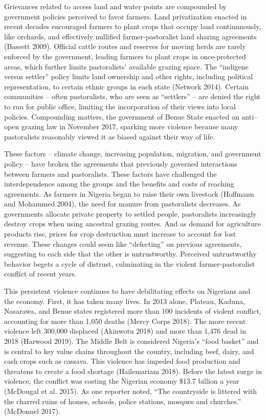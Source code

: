 \documentclass[11pt]{article}
\begin{document}
Grievances related to access land and water points are compounded by
government policies perceived to favor farmers. Land privatization
enacted in recent decades encouraged farmers to plant crops that occupy
land continunously, like orchards, and effectively nullified
farmer-pastoralist land sharing agreements (Bassett 2009). Official
cattle routes and reserves for moving herds are rarely enforced by the
government, leading farmers to plant crops in once-protected areas,
which further limits pastoralists' available grazing space. The
``indigene versus settler'' policy limits land ownership and other
rights, including political representation, to certain ethnic groups in
each state (Network 2014). Certain communities -- often pastoralists,
who are seen as ``settlers'' -- are denied the right to run for public
office, limiting the incorporation of their views into local policies.
Compounding matters, the government of Benue State enacted an anti--open
grazing law in November 2017, sparking more violence because many
pastoralists reasonably viewed it as biased against their way of life.

These factors -- climate change, increasing population, migration, and
government policy -- have broken the agreements that previously governed
interactions between farmers and pastoralists. These factors have
challenged the interdependence among the groups and the benefits and
costs of reaching agreements. As farmers in Nigeria began to raise their
own livestock (Hoffmann and Mohammed 2004), the need for manure from
pastoralists decreases. As governments allocate private property to
settled people, pastoralists increasingly destroy crops when using
ancestral grazing routes. And as demand for agriculture products rise,
prices for crop destruction must increase to account for lost revenue.
These changes could seem like ``defecting'' on previous agreements,
suggesting to each side that the other is untrustworthy. Perceived
untrustworthy behavior begets a cycle of distrust, culminating in the
violent farmer-pastoralist conflict of recent years.

This persistent violence continues to have debilitating effects on
Nigerians and the economy. First, it has taken many lives. In 2013
alone, Plateau, Kaduna, Nasarawa, and Benue states registered more than
100 incidents of violent conflict, accounting for more than 1,050 deaths
(Mercy Corps 2018). The more recent violence left 300,000 displaced
(Akinwotu 2018) and more than 1,476 dead in 2018 (Harwood 2019). The
Middle Belt is considered Nigeria's ``food basket'' and is central to
key value chains throughout the country, including beef, dairy, and cash
crops such as cassava. This violence has impeded food production and
threatens to create a food shortage (Hailemariam 2018). Before the
latest surge in violence, the conflict was costing the Nigerian economy
\$13.7 billion a year (McDougal et al. 2015). As one reporter noted,
``The countryside is littered with the charred ruins of homes, schools,
police stations, mosques and churches.'' (McDonnel 2017).
\end{document}
